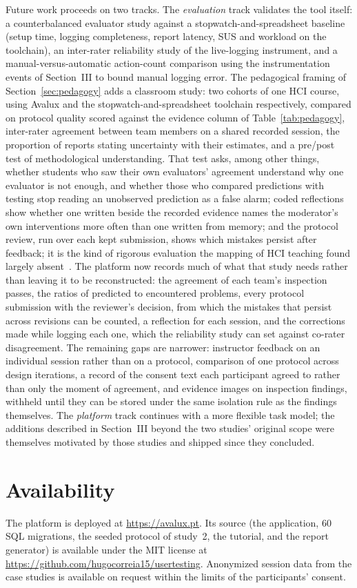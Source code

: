 \documentclass[conference]{IEEEtran}
\begin{document}
Future work proceeds on two tracks. The \emph{evaluation} track validates
the tool itself: a counterbalanced evaluator study against a
stopwatch-and-spreadsheet baseline (setup time, logging completeness,
report latency, SUS and workload on the toolchain), an inter-rater
reliability study of the live-logging instrument, and a
manual-versus-automatic action-count comparison using the
instrumentation events of Section~III to bound manual logging error.
The pedagogical framing of Section~\ref{sec:pedagogy} adds a classroom study: two
cohorts of one HCI course, using Avalux and the
stopwatch-and-spreadsheet toolchain respectively, compared on
protocol quality scored against the evidence column of
Table~\ref{tab:pedagogy}, inter-rater agreement between team
members on a shared recorded session, the proportion of reports
stating uncertainty with their estimates, and a pre/post test of
methodological understanding. That test asks, among other things, whether
students who saw their own evaluators' agreement understand why one
evaluator is not enough, and whether those who compared predictions with
testing stop reading an unobserved prediction as a false alarm; coded
reflections show whether one written beside the recorded evidence names the
moderator's own interventions more often than one written from memory; and
the protocol review, run over each kept submission, shows which mistakes
persist after feedback; it is the kind of rigorous evaluation the mapping
of HCI teaching found largely absent~\cite{lima2019tools}. The platform
now records much of what that study needs rather than leaving it to be
reconstructed: the agreement of each team's inspection passes, the ratios
of predicted to encountered problems, every protocol submission with the
reviewer's decision, from which the mistakes that persist across revisions
can be counted, a reflection for each session, and the corrections made
while logging each one, which the reliability study can set against
co-rater disagreement. The remaining gaps are narrower: instructor feedback
on an individual session rather than on a protocol, comparison of one
protocol across design iterations, a record of the consent text each
participant agreed to rather than only the moment of agreement, and
evidence images on inspection findings, withheld until they can be stored
under the same isolation rule as the findings themselves.
The \emph{platform} track continues with a more flexible task model;
the additions described in Section~III beyond the two studies' original
scope were themselves motivated by those studies and shipped since
they concluded.

\section*{Availability}
The platform is deployed at \url{https://avalux.pt}. Its source (the
application, 60 SQL migrations, the seeded protocol of study~2, the
tutorial, and the report generator) is available under the MIT license
at \url{https://github.com/hugocorreia15/usertesting}. Anonymized
session data from the case studies is available on request within the
limits of the participants' consent.

\balance


\end{document}
